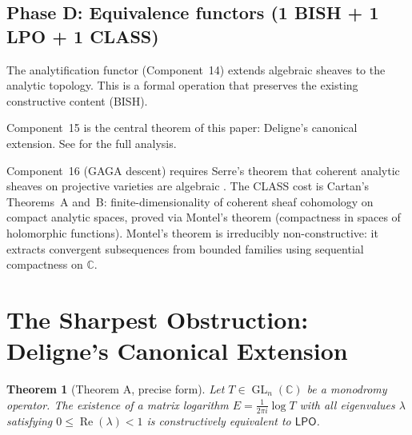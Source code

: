 \documentclass[11pt,a4paper]{article}
\theoremstyle{plain}
\newtheorem{theorem}{Theorem}[section]
\theoremstyle{definition}
\newcommand{\BISH}{\textsf{BISH}}
\newcommand{\LPO}{\textsf{LPO}}
\newcommand{\CLASS}{\textsf{CLASS}}
\newcommand{\C}{\mathbb{C}}
\DeclareMathOperator{\GL}{GL}
\renewcommand{\Re}{\operatorname{Re}}
\begin{document}
\subsection{Phase D: Equivalence functors (1 \BISH{} + 1 \LPO{} + 1 \CLASS)}

The analytification functor (Component~14) extends algebraic sheaves to the analytic topology.
This is a formal operation that preserves the existing constructive content (\BISH).

Component~15 is the central theorem of this paper: Deligne's canonical extension.
See  for the full analysis.

Component~16 (GAGA descent) requires Serre's theorem that coherent analytic sheaves on projective varieties are algebraic \cite{Serre1956}.
The \CLASS{} cost is Cartan's Theorems~A and~B: finite-dimensionality of coherent sheaf cohomology on compact analytic spaces, proved via Montel's theorem (compactness in spaces of holomorphic functions).
Montel's theorem is irreducibly non-constructive: it extracts convergent subsequences from bounded families using sequential compactness on $\C$.

\section{The Sharpest Obstruction: Deligne's Canonical Extension}
\label{sec:deligne}

\begin{theorem}[Theorem A, precise form]\label{thm:deligne-lpo}
Let $T \in \GL_n(\C)$ be a monodromy operator.
The existence of a matrix logarithm $E = \frac{1}{2\pi i} \log T$ with all eigenvalues $\lambda$ satisfying $0 \le \Re(\lambda) < 1$ is constructively equivalent to $\LPO$.
\end{theorem}
\end{document}
